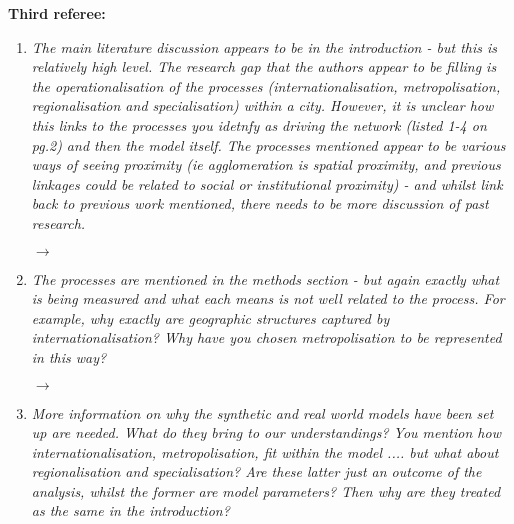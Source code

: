 \documentclass[10pt,a4paper,sans]{moderncv}        %
\begin{document}
\bigskip

\textbf{Third referee:}

\medskip


\begin{enumerate}

	\item \textit{The main literature discussion appears to be in the introduction - but this is relatively high level. The research gap that the authors appear to be filling is the operationalisation of the processes (internationalisation, metropolisation, regionalisation and specialisation) within a city. However, it is unclear how this links to the processes you idetnfy as driving the network (listed 1-4 on pg.2) and then the model itself. The processes mentioned appear to be various ways of seeing proximity (ie agglomeration is spatial proximity, and previous linkages could be related to social or institutional proximity) - and whilst link back to previous work mentioned, there needs to be more discussion of past research.}
	
	$\rightarrow$
	
	\medskip

	\item \textit{The processes are mentioned in the methods section - but again exactly what is being measured and what each means is not well related to the process. For example, why exactly are geographic structures captured by internationalisation? Why have you chosen metropolisation to be represented in this way?}

	$\rightarrow$
	
	\medskip

	\item \textit{More information on why the synthetic and real world models have been set up are needed. What do they bring to our understandings? You mention how internationalisation, metropolisation, fit within the model .... but what about regionalisation and specialisation? Are these latter just an outcome of the analysis, whilst the former are model parameters? Then why are they treated as the same in the introduction?}


\end{enumerate}
\end{document}
